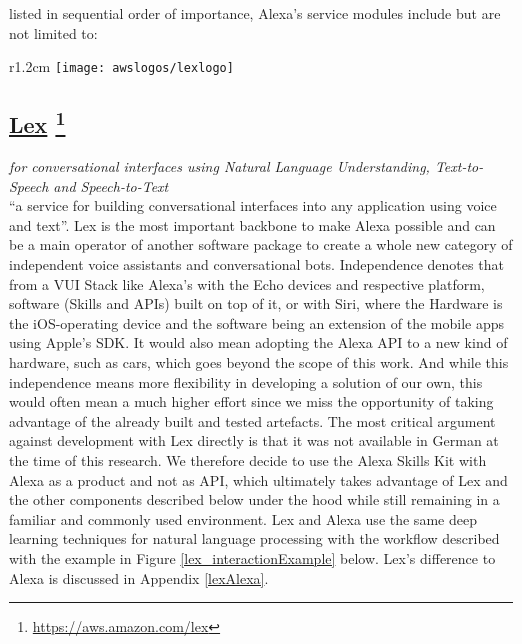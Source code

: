 listed in sequential order of importance, Alexa's service modules include but are not limited to: 




%	
\begin{wrapfigure}[2]{r}{1.2cm}
	\texttt{[image: awslogos/lexlogo]}
\end{wrapfigure}
%


\subsection*{
	\href{https://aws.amazon.com/lex/}{\textbf{Lex}} \footnote{\url{https://aws.amazon.com/lex}}
}
	\textit{for conversational interfaces using Natural Language Understanding, Text-to-Speech and Speech-to-Text} \\
	``a service for building conversational interfaces into any application using voice and text''\cite{aws_website}.
	Lex is the most important backbone to make Alexa possible and can be a main operator of another software package to create a whole new category of independent voice assistants and conversational bots. Independence denotes that  from a VUI Stack like Alexa's with the Echo devices and respective platform, software (Skills and APIs) built on top of it, or with  Siri, where the Hardware is the iOS-operating device and the software being an extension of the mobile apps using Apple's SDK. It would also mean adopting the Alexa API to a new kind of hardware, such as cars, which goes beyond the scope of this work. And while this independence means more flexibility in developing a solution of our own, this would often mean a much higher effort since we miss the opportunity of taking advantage of the already built and tested artefacts. The most critical argument against development with Lex directly is that it was not available in German at the time of this research. We therefore decide to use the Alexa Skills Kit with Alexa as a product and not as API, which ultimately takes advantage of Lex and the other components described below under the hood while still remaining in a familiar and commonly used environment. Lex and Alexa use the same deep learning techniques for natural language processing with the workflow described with the example in Figure \ref{lex_interactionExample} below. Lex's difference to Alexa  is discussed in Appendix \ref{lexAlexa}.


